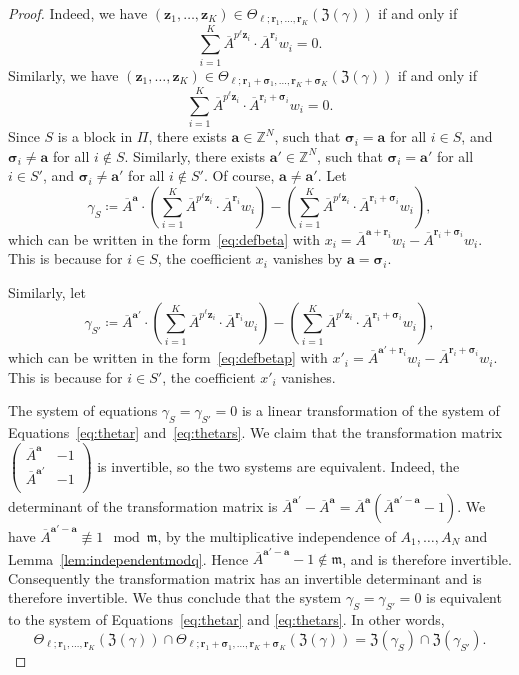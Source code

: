 \documentclass[letterpaper, 11pt, thm-restate]{article}
\numberwithin{equation}{section}
\newcommand{\Z}{\mathbb{Z}}
\newcommand{\mZ}{\mathfrak{Z}}
\newcommand{\ba}{\boldsymbol{a}}
\newcommand{\br}{\boldsymbol{r}}
\newcommand{\bz}{\boldsymbol{z}}
\newcommand{\bsig}{\boldsymbol{\sigma}}
\newcommand{\oA}{\overline{A}}
\newcommand{\frm}{\mathfrak{m}}
\theoremstyle{definition}
\theoremstyle{definition}
\theoremstyle{definition}
\begin{document}
\begin{proof}
    Indeed, we have $(\bz_1, \ldots, \bz_K) \in \Theta_{\ell; \br_1, \ldots, \br_K}(\mZ(\gamma))$ if and only if
    \begin{equation}\label{eq:thetar}
        \sum_{i = 1}^K \oA^{p^{\ell} \bz_{i}} \cdot \oA^{\br_i} w_i = 0.
    \end{equation}
    Similarly, we have $(\bz_1, \ldots, \bz_K) \in \Theta_{\ell; \br_{1} + \bsig_{1}, \ldots, \br_{K} + \bsig_{K}}(\mZ(\gamma))$ if and only if
    \begin{equation}\label{eq:thetars}
        \sum_{i = 1}^K \oA^{p^{\ell} \bz_{i}} \cdot \oA^{\br_i + \bsig_i} w_i = 0.
    \end{equation}
    Since $S$ is a block in $\Pi$, there exists $\ba \in \Z^N$, such that $\bsig_i = \ba$ for all $i \in S$, and $\bsig_i \neq \ba$ for all $i \notin S$.
    Similarly, there exists $\ba' \in \Z^N$, such that $\bsig_i = \ba'$ for all $i \in S'$, and $\bsig_i \neq \ba'$ for all $i \notin S'$.
    Of course, $\ba \neq \ba'$.
    Let
    \[
        \gamma_S \coloneqq \oA^{\ba} \cdot \left(\sum_{i = 1}^K \oA^{p^{\ell} \bz_{i}} \cdot \oA^{\br_i} w_i\right)
        - \left(\sum_{i = 1}^K \oA^{p^{\ell} \bz_{i}} \cdot \oA^{\br_i + \bsig_i} w_i\right),
    \]
    which can be written in the form~\eqref{eq:defbeta} with $x_i = \oA^{\ba + \br_i} w_i - \oA^{\br_i + \bsig_i} w_i$.
    This is because for $i \in S$, the coefficient $x_i$ vanishes by $\ba = \bsig_i$.
    
    Similarly, let
    \[
        \gamma_{S'} \coloneqq \oA^{\ba'} \cdot \left(\sum_{i = 1}^K \oA^{p^{\ell} \bz_{i}} \cdot \oA^{\br_i} w_i\right)
        - \left(\sum_{i = 1}^K \oA^{p^{\ell} \bz_{i}} \cdot \oA^{\br_i + \bsig_i} w_i\right),
    \]
    which can be written in the form~\eqref{eq:defbetap} with $x'_i = \oA^{\ba' + \br_i} w_i - \oA^{\br_i + \bsig_i} w_i$.
    This is because for $i \in S'$, the coefficient $x'_i$ vanishes.

    The system of equations $\gamma_S = \gamma_{S'} = 0$ is a linear transformation of the system of Equations~\eqref{eq:thetar} and~\eqref{eq:thetars}.
    We claim that the transformation matrix
    $
    \begin{pmatrix}
        \oA^{\ba} & -1 \\
        \oA^{\ba'} & -1 \\
    \end{pmatrix}
    $
    is invertible, so the two systems are equivalent.
    Indeed, the determinant of the transformation matrix is $\oA^{\ba'} - \oA^{\ba} = \oA^{\ba}\left(\oA^{\ba' - \ba} - 1\right)$. We have $\oA^{\ba' - \ba} \not\equiv 1 \mod \frm$, by the multiplicative independence of $A_1, \ldots, A_N$ and Lemma~\ref{lem:independentmodq}. Hence $\oA^{\ba' - \ba} - 1 \notin \frm$, and is therefore invertible.
    Consequently the transformation matrix has an invertible determinant and is therefore invertible.
    We thus conclude that the system $\gamma_S = \gamma_{S'} = 0$ is equivalent to the system of Equations~\eqref{eq:thetar} and \eqref{eq:thetars}.
    In other words,
    \[
    \Theta_{\ell; \br_1, \ldots, \br_K}(\mZ(\gamma)) \cap \Theta_{\ell; \br_{1} + \bsig_{1}, \ldots, \br_{K} + \bsig_{K}}(\mZ(\gamma)) = \mZ(\gamma_S) \cap \mZ(\gamma_{S'}).
    \]
    

\end{proof}
\end{document}
